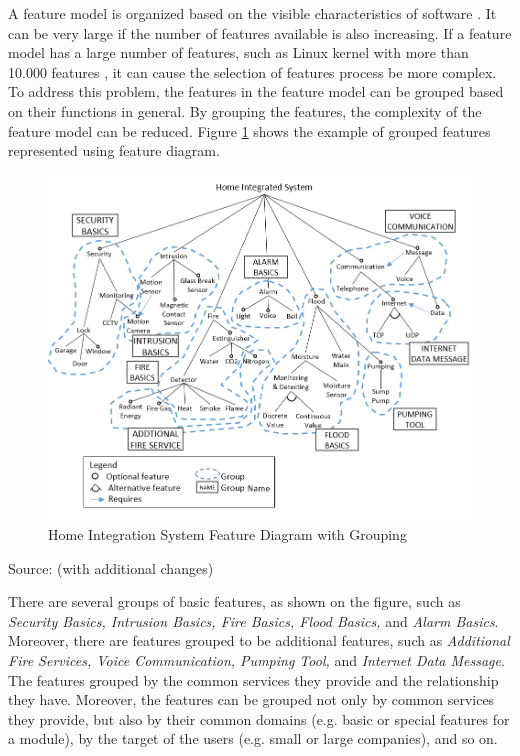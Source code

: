 A feature model is organized based on the visible characteristics of software \citep{paper.lee.featuremanagement}. It can be very large if the number of features available is also increasing. If a feature model has a large number of features, such as Linux kernel with more than 10.000 features \citep{book.apel.FeatureOrientedSoftware}, it can cause the selection of features process be more complex. To address this problem, the features in the feature model can be grouped based on their functions in general. By grouping the features, the complexity of the feature model can be reduced. Figure \ref{fig:FMGroup1} shows the example of grouped features represented using feature diagram.

\begin{figure}
	\centering
	\includegraphics[width=1\textwidth]
	{pics/hisfd4group3.png}
	\caption{Home Integration System Feature Diagram with Grouping}
	\label{fig:FMGroup1}
\end{figure}
\vspace{-1cm}
\begin{center}
	{\small Source: \citep{paper.lee.featurebinding} (with additional changes)}
\end{center}

There are several groups of basic features, as shown on the figure, such as {\it Security Basics, Intrusion Basics, Fire Basics, Flood Basics,} and {\it Alarm Basics}. Moreover, there are features grouped to be additional features, such as {\it Additional Fire Services, Voice Communication, Pumping Tool,} and {\it Internet Data Message}. The features grouped by the common services they provide and the relationship they have. Moreover, the features can be grouped not only by common services they provide, but also by their common domains (e.g. basic or special features for a module), by the target of the users (e.g. small or large companies), and so on.

